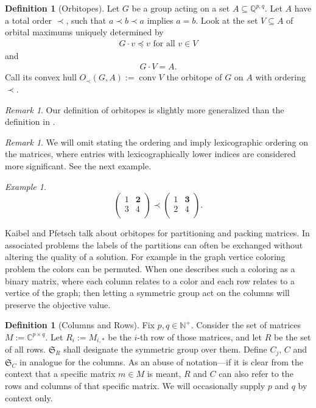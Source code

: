 \documentclass[a4paper]{amsart}
\theoremstyle{lemma}
\theoremstyle{definition}
\newtheorem{defn}[theorem]{Definition}
\theoremstyle{remark}
\newtheorem{remark}[theorem]{Remark}
\theoremstyle{example}
\newtheorem{example}[theorem]{Example}
\DeclareMathOperator{\conv}{conv}
\newcommand{\lex}{\ensuremath{\prec}} %
\newcommand{\lr}[1]{\ensuremath{\left( #1 \right)}}
\newcommand{\naturals}{\ensuremath{\mathbb{N}}}
\newcommand{\rationals}{\ensuremath{\mathbb{Q}}}
\newcommand{\Sym}{\ensuremath{\mathfrak{S}}}
\begin{document}
 \begin{defn}[Orbitopes]
   Let \(G\) be a group acting on a set \(A \subseteq \rationals^{p,q}\).  Let \(A\) have a total order \(\lex\), such that \(a\lex b \lex a\) implies \(a = b\).
   Look at the set \(V \subseteq A\) of orbital maximums uniquely determined by
   \begin{align}
     \label{biggest}
       G \cdot v  \preceq v  \text{ for all } v \in V
     \end{align}
   and
   \begin{align}
     \label{complete}
     G \cdot V =  A \text{.}
   \end{align}
   Call its convex hull \(O_{\lex} \lr{G, A} := \conv{}  V\) the orbitope of
   \(G\) on \(A\) with ordering \(\lex\).  
 \end{defn}
\begin{remark}
  Our definition of orbitopes is slightly more generalized than the definition in \cite{orbi}.
\end{remark}
\begin{remark}
  We will omit stating the ordering and imply lexicographic ordering
  on the matrices, where entries with lexicographically lower indices
  are considered more significant.  See the next example.
\end{remark}
\begin{example}
  \label{lex_ex}
  \[\lr{\begin{matrix}
      1 & \mathbf{2} \\
      3 & 4 \\
    \end{matrix}
  }
  \lex
  \lr{\begin{matrix}
      1 & \mathbf{3} \\
      2 & 4 \\
    \end{matrix}
  }\text{.}
  \]
\end{example}
Kaibel and Pfetsch talk about orbitopes for partitioning and packing
matrices.  In associated problems the labels of the partitions can
often be exchanged without altering the quality of a solution.  For
example in the graph vertice coloring problem the colors can be
permuted.  When one describes such a coloring as a binary matrix,
where each column relates to a color and each row relates to a vertice
of the graph; then letting a symmetric group act on the columns will
preserve the objective value.

\begin{defn}[Columns and Rows]
  Fix \(p, q \in \naturals^+\).  Consider the set of matrices \(M :=
  \mathbb{C}^{p \times q}\).  Let \(R_i := M_{i, *}\) be the \(i\)-th
  row of those matrices, and let \(R\) be the set of all rows.
  \(\Sym_R\) shall designate the symmetric group over them.  Define
  \(C_j\), \(C\) and \(\Sym_C\) in analogue for the columns.  As an
  abuse of notation---if it is clear from the context that a specific
  matrix \(m \in M\) is meant, \(R\) and \(C\) can also refer to the
  rows and columns of that specific matrix.  We will occasionally
  supply \(p\) and \(q\) by context only.
\end{defn}
\end{document}
